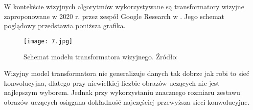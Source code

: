 W kontekście wizyjnych algorytmów wykorzystywane są transformatory wizyjne zaproponowane w 2020 r. przez zespół Google Research w \cite{dosovitskiy2020}. Jego schemat poglądowy przedstawia poniższa grafika.
\begin{figure}[H]
    \centering
    \texttt{[image: 7.jpg]}
    \caption{Schemat modelu transformatora wizyjnego. Źródło: \cite{dosovitskiy2020}}
    \label{fig:schemat-vit}
\end{figure}
Wizyjny model transformatora nie generalizuje danych tak dobrze jak robi to sieć konwolucyjna, dlatego przy niewielkiej liczbie obrazów uczących nie jest najlepszym wyborem. Jednak przy wykorzystaniu znacznego rozmiaru zestawu obrazów uczących osiągana dokładność najczęściej przewyższa sieci konwolucyjne.